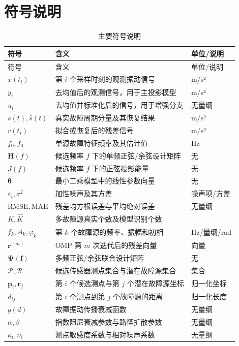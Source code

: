 \documentclass[UTF8,a4paper,12pt]{ctexart}
\numberwithin{figure}{section}
\numberwithin{table}{section}
\begin{document}
\section{符号说明}
\begin{longtable}{>{\centering\arraybackslash}p{3.1cm}p{7.8cm}>{\centering\arraybackslash}p{2.8cm}}
\caption{主要符号说明}\\
\toprule
符号 & 含义 & 单位/说明\\
\midrule
\endfirsthead
\toprule
符号 & 含义 & 单位/说明\\
\midrule
\endhead
$x(t_i)$ & 第 \(i\) 个采样时刻的观测振动信号 & m/s²\\
$y_i$ & 去均值后的观测信号，用于主投影模型 & m/s²\\
$u_i$ & 去均值并标准化后的信号，用于增强分支 & 无量纲\\
$s(t),\hat s(t)$ & 真实故障周期分量及其恢复结果 & m/s²\\
$r(t_i)$ & 拟合或恢复后的残差信号 & m/s²\\
$f_0,\hat f_0$ & 单源故障特征频率及其估计值 & Hz\\
$\mathbf H(f)$ & 候选频率 \(f\) 下的单频正弦/余弦设计矩阵 & 无\\
$J(f)$ & 候选频率 \(f\) 下的正弦投影能量 & 无\\
$\boldsymbol\theta$ & 最小二乘模型中的线性参数向量 & 无\\
$\varepsilon_i,\sigma^2$ & 加性噪声及其方差 & 噪声项/方差\\
$\mathrm{RMSE},\mathrm{MAE}$ & 残差均方根误差与平均绝对误差 & 无量纲\\
$K,\hat K$ & 多故障源真实个数及模型识别个数 & 1\\
$f_k,A_k,\varphi_k$ & 第 \(k\) 个故障源的频率、振幅和初相 & Hz/量纲/rad\\
$\mathbf r^{(m)}$ & OMP 第 \(m\) 次迭代后的残差向量 & 向量\\
$\boldsymbol\Psi(\mathbf f)$ & 多频正弦/余弦联合设计矩阵 & 无\\
$\mathcal P,\mathcal R$ & 候选传感器测点集合与潜在故障源集合 & 集合\\
$\boldsymbol p_i,\boldsymbol r_j$ & 第 \(i\) 个候选测点与第 \(j\) 个潜在故障源坐标 & 归一化坐标\\
$d_{ij}$ & 第 \(i\) 个测点到第 \(j\) 个故障源的距离 & 归一化长度\\
$g(d)$ & 故障振动传播衰减函数 & 无量纲\\
$\alpha,\beta$ & 指数阻尼衰减参数与路径扩散参数 & 无量纲\\
$\kappa_i,\nu_i$ & 测点敏感度系数与相对噪声系数 & 无量纲\\

\end{longtable}
\end{document}
